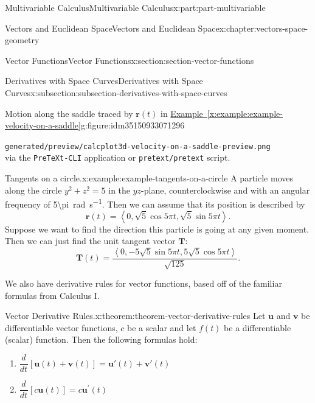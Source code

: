 \documentclass[twoside,10pt,]{tufte-book}
\newcommand{\xreffont}{\relax}
\newcommand{\mono}[1]{\texttt{#1}}
\numberwithin{equation}{part}
\newlength{\qrsize}
\newlength{\previewwidth}
\newcommand{\vb}[1]{\mathbf{#1}}
\newcommand{\dv}[3][]{\dfrac{d^{#1} #2}{d #3^{#1}}}
\newcommand{\dotprod}[1]{\left\langle #1 \right\rangle}
\begin{document}
\begin{partptx}{Multivariable Calculus}{}{Multivariable Calculus}{}{}{x:part:part-multivariable}
\begin{chapterptx}{Vectors and Euclidean Space}{}{Vectors and Euclidean Space}{}{}{x:chapter:vectors-space-geometry}
\begin{sectionptx}{Vector Functions}{}{Vector Functions}{}{}{x:section:section-vector-functions}
\begin{subsectionptx}{Derivatives with Space Curves}{}{Derivatives with Space Curves}{}{}{x:subsection:subsection-derivatives-with-space-curves}
\begin{figureptx}{Motion along the saddle traced by \(\vb{r}(t)\) in \hyperref[x:example:example-velocity-on-a-saddle]{Example~{\xreffont\ref{x:example:example-velocity-on-a-saddle}}}}{g:figure:idm35150933071296}{}
\begin{tcbraster}[raster columns=2, raster column skip=1pt, raster halign=center, raster force size=false, raster left skip=0pt, raster right skip=0pt]
\begin{tcolorbox}[previewstyle, width=\previewwidth]
{\mono{generated/preview/calcplot3d-velocity-on-a-saddle-preview.png}\\%
via the \mono{PreTeXt-CLI} application or \mono{pretext/pretext} script.}%
\end{tcolorbox}%
\begin{tcolorbox}[qrstyle]%
{\hypersetup{urlcolor=black}}%
\end{tcolorbox}%
\end{tcbraster}%
\tcblower
\end{figureptx}%
\begin{example}{Tangents on a circle.}{x:example:example-tangents-on-a-circle}%
A particle moves along the circle \(y^{2}+z^{2}=5\) in the \(yz\)-plane, counterclockwise and with an angular frequency of \SI{5\pi}{\radian\per\second}. Then we can assume that its position is described by%
%
\begin{equation*}
\mathbf{r}(t) = \dotprod{0,\sqrt{5}\cos5\pi t, \sqrt{5}\sin5\pi t}.
\end{equation*}
Suppose we want to find the direction this particle is going at any given moment. Then we can just find the unit tangent vector \(\mathbf{T}\):%
%
\begin{equation*}
\mathbf{T}(t) = \frac{\dotprod{0,-5\sqrt{5}\sin5\pi t, 5\sqrt{5}\cos5\pi t}}{\sqrt{125}}.
\end{equation*}
\end{example}
We also have derivative rules for vector functions, based off of the familiar formulas from Calculus I.%
\begin{theorem}{Vector Derivative Rules.}{}{x:theorem:theorem-vector-derivative-rules}%
%
Let \(\mathbf{u}\) and \(\mathbf{v}\) be differentiable vector functions, \(c\) be a scalar and let \(f(t)\) be a differentiable (scalar) function. Then the following formulas hold:%
%
\begin{enumerate}
\item{}\(\displaystyle \dv{}{t}[\mathbf{u}(t)+\mathbf{v}(t)] = \mathbf{u}'(t)+\mathbf{v}'(t)\)%
\item{}\(\displaystyle \dv{}{t}[c\mathbf{u}(t)] = c\mathbf{u}^{\prime}(t)\)%

\end{enumerate}
\end{theorem}
\end{subsectionptx}
\end{sectionptx}
\end{chapterptx}
\end{partptx}
\end{document}
